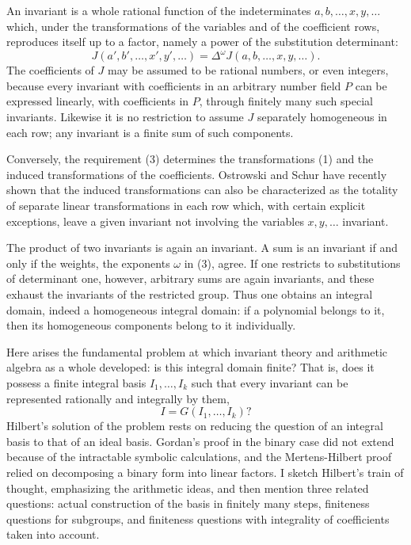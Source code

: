 \documentclass[11pt]{article}
\begin{document}
An invariant is a whole rational function of the indeterminates $a,b,\ldots,x,y,\ldots$ which, under the transformations of the variables and of the coefficient rows, reproduces itself up to a factor, namely a power of the substitution determinant:
\begin{equation}
  J(a',b',\ldots,x',y',\ldots)=\Delta^\omega J(a,b,\ldots,x,y,\ldots).              \tag{3}
\end{equation}
The coefficients of $J$ may be assumed to be rational numbers, or even integers, because every invariant with coefficients in an arbitrary number field $P$ can be expressed linearly, with coefficients in $P$, through finitely many such special invariants. Likewise it is no restriction to assume $J$ separately homogeneous in each row; any invariant is a finite sum of such components.

Conversely, the requirement (3) determines the transformations (1) and the induced transformations of the coefficients. Ostrowski and Schur have recently shown that the induced transformations can also be characterized as the totality of separate linear transformations in each row which, with certain explicit exceptions, leave a given invariant not involving the variables $x,y,\ldots$ invariant.

The product of two invariants is again an invariant. A sum is an invariant if and only if the weights, the exponents $\omega$ in (3), agree. If one restricts to substitutions of determinant one, however, arbitrary sums are again invariants, and these exhaust the invariants of the restricted group. Thus one obtains an integral domain, indeed a homogeneous integral domain: if a polynomial belongs to it, then its homogeneous components belong to it individually.

Here arises the fundamental problem at which invariant theory and arithmetic algebra as a whole developed: is this integral domain finite? That is, does it possess a finite integral basis $I_1,\ldots,I_k$ such that every invariant can be represented rationally and integrally by them,
\[
  I=G(I_1,\ldots,I_k)?
\]
Hilbert's solution of the problem rests on reducing the question of an integral basis to that of an ideal basis. Gordan's proof in the binary case did not extend because of the intractable symbolic calculations, and the Mertens-Hilbert proof relied on decomposing a binary form into linear factors. I sketch Hilbert's train of thought, emphasizing the arithmetic ideas, and then mention three related questions: actual construction of the basis in finitely many steps, finiteness questions for subgroups, and finiteness questions with integrality of coefficients taken into account.
\end{document}
